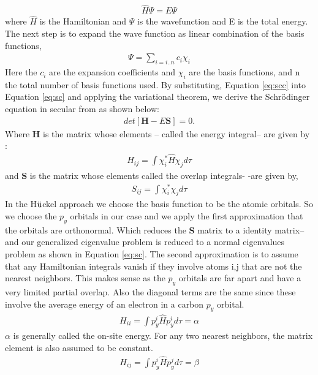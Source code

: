 \documentclass[9pt,twocolumn,twoside]{optica}
\begin{document}
\begin{align}
 \hat{H}\Psi = E\Psi
 \label{eq:sc}
\end{align}
where $\hat{H}$ is the Hamiltonian and $\Psi$ is the wavefunction and E is the total energy. The next step is to expand the wave function as linear combination of the basis functions,
\begin{align}
 \Psi=\sum_{i=i..n}c_i \chi_i
 \label{eq:scc}
\end{align}
Here the $c_i$ are the expansion coefficients and  $ \chi_i$ are the basis functions, and n the total number of basis functions used. By substituting, Equation  \ref{eq:scc} into Equation  \ref{eq:sc} and applying the variational theorem, we derive the Schrödinger equation in secular from as shown below:
\begin{align}
 det[\textbf{H}-E\textbf{S}]=0.
 \label{eq:sec}
\end{align}
Where \textbf{H} is the matrix whose elements -- called the energy integral-- are given by :
\begin{align}
 H_{ij}=\int \chi_i ^{*} \hat{H}  \chi_j d\tau
 \label{eq:genH}
\end{align}
and \textbf{S}  is the matrix whose elements called the overlap integrals- -are given by,
\begin{align}
 S_{ij}=\int \chi_i ^{*} \chi_j d\tau
 \label{eq:overlap}
\end{align}
In the H$\ddot{\text u}$ckel approach we choose the basis function to be the atomic orbitals. So we choose the $p_y$ orbitals in our case and we apply the first approximation that the orbitals are orthonormal. Which reduces the \textbf{S}  matrix to a identity matrix-- and our generalized eigenvalue problem is reduced to a normal eigenvalues problem as shown in Equation \ref{eq:sc}. The second approximation is to assume that any Hamiltonian integrals vanish if they involve atoms i,j that are not the nearest neighbors. This makes sense as the  $p_y$ orbitals are far apart and have a very limited partial overlap. Also the diagonal terms are the same since these involve the average energy of an electron in a carbon $p_y$ orbital.
\begin{align}
 H_{ii}=\int p_y ^{i} \hat{H}  p_y ^{i} d\tau =\alpha
 \label{eq:pHii}
\end{align}
$\alpha$ is generally called the on-site energy. For any two nearest neighbors, the matrix element is also assumed to be constant. 
\begin{align}
 H_{ij}=\int p_y ^{i} \hat{H}  p_y ^{j} d\tau =\beta
 \label{eq:pHij}
\end{align}
\end{document}
